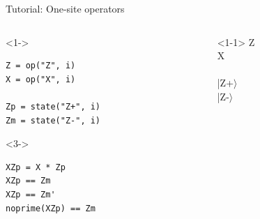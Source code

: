 \begin{frame}[fragile]{Tutorial: One-site operators}

\begin{columns}

\begin{column}{4.5cm}

\begin{onlyenv}<1->
\begin{lstlisting}[language=JuliaLocal, style=julia, basicstyle=\small]
Z = op("Z", i)
X = op("X", i)

Zp = state("Z+", i)
Zm = state("Z-", i)
\end{lstlisting}
\end{onlyenv}

\begin{onlyenv}<3->
\begin{lstlisting}[language=JuliaLocal, style=julia, basicstyle=\small]
XZp = X * Zp
XZp == Zm
XZp == Zm'
noprime(XZp) == Zm
\end{lstlisting}
\end{onlyenv}

\end{column}

\begin{column}{4.5cm}

\begin{onlyenv}<1-1>
Z \\
X \\
~\\
|Z+$\rangle$ \\
|Z-$\rangle$ \\
\end{onlyenv}


\end{column}
\end{columns}
\end{frame}
